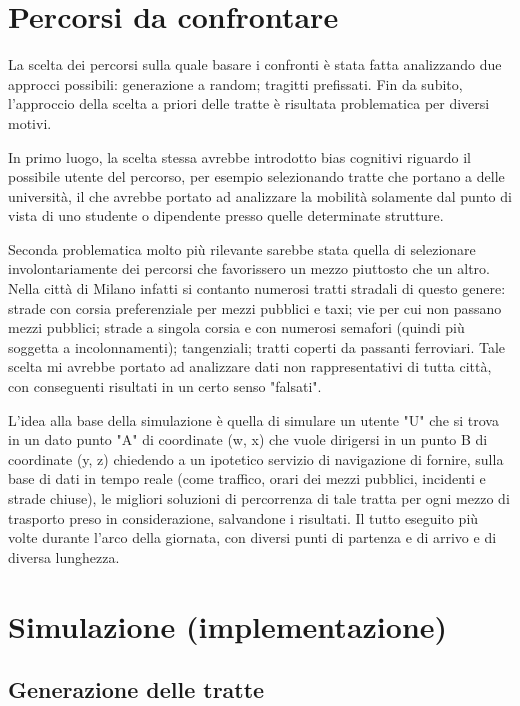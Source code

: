 \section{Percorsi da confrontare}

La scelta dei percorsi sulla quale basare i confronti è stata fatta analizzando due approcci possibili: generazione a random; tragitti prefissati. Fin da subito, l'approccio della scelta a priori delle tratte è risultata problematica per diversi motivi.

In primo luogo, la scelta stessa avrebbe introdotto bias cognitivi riguardo il possibile utente del percorso, per esempio selezionando tratte che portano a delle università, il che avrebbe portato ad analizzare la mobilità solamente dal punto di vista di uno studente o dipendente presso quelle determinate strutture.

Seconda problematica molto più rilevante sarebbe stata quella di selezionare involontariamente dei percorsi che favorissero un mezzo piuttosto che un altro. Nella città di Milano infatti si contanto numerosi tratti stradali di questo genere: strade con corsia preferenziale per mezzi pubblici e taxi; vie per cui non passano mezzi pubblici; strade a singola corsia e con numerosi semafori (quindi più soggetta a incolonnamenti); tangenziali; tratti coperti da passanti ferroviari. Tale scelta mi avrebbe portato ad analizzare dati non rappresentativi di tutta città, con conseguenti risultati in un certo senso "falsati".


L'idea alla base della simulazione è quella di simulare un utente "U" che si trova in un dato punto "A" di coordinate (w, x) che vuole dirigersi in un punto B di coordinate (y, z) chiedendo a un ipotetico servizio di navigazione di fornire, sulla base di dati in tempo reale (come traffico, orari dei mezzi pubblici, incidenti e strade chiuse), le migliori soluzioni di percorrenza di tale tratta per ogni mezzo di trasporto preso in considerazione, salvandone i risultati. Il tutto eseguito più volte durante l'arco della giornata, con diversi punti di partenza e di arrivo e di diversa lunghezza.


\section{Simulazione (implementazione)}

\subsection{Generazione delle tratte}

